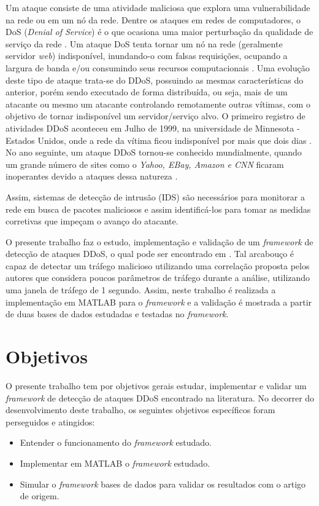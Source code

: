 Um ataque consiste de uma atividade maliciosa que explora uma vulnerabilidade na rede ou em um nó da rede. Dentre os ataques em redes de computadores, o DoS (\textit{Denial of Service}) é o que ocasiona uma maior perturbação da qualidade de serviço da rede \cite{badishi2006exposing}. Um ataque DoS tenta tornar um nó na rede (geralmente servidor \textit{web}) indisponível, inundando-o com falsas requisições, ocupando a largura de banda e/ou consumindo seus recursos computacionais \cite{1638123}. Uma evolução deste tipo de ataque trata-se do DDoS, possuindo as mesmas características do anterior, porém sendo executado de forma distribuída, ou seja, mais de um atacante ou mesmo um atacante controlando remotamente outras vítimas, com o objetivo de tornar indisponível um servidor/serviço alvo. O primeiro registro de atividades DDoS aconteceu em Julho de 1999, na universidade de Minnesota - Estados Unidos, onde a rede da vítima ficou indisponível por mais que dois dias \cite{srivastava2011recent}. No ano seguinte, um ataque DDoS tornou-se conhecido mundialmente, quando um grande número de sites como o \textit{Yahoo, EBay, Amazon e CNN} ficaram inoperantes devido a ataques dessa natureza \cite{calce2008mafiaboy}.

Assim, sistemas de detecção de intrusão (IDS) são necessários para monitorar a rede em busca de pacotes maliciosos e assim identificá-los para tomar as medidas corretivas que impeçam o avanço do atacante.

O presente trabalho faz o estudo, implementação e validação de um \textit{framework} de detecção de ataques DDoS, o qual pode ser encontrado em \cite{HOQUE201748}. Tal arcabouço é capaz de detectar um tráfego malicioso utilizando uma correlação proposta pelos autores que considera poucos parâmetros de tráfego durante a análise, utilizando uma janela de tráfego de 1 segundo. Assim, neste trabalho é realizada a implementação em MATLAB para o \textit{framework} e a validação é mostrada a partir de duas bases de dados estudadas e testadas no \textit{framework}.  

\section{Objetivos}
O presente trabalho tem por objetivos gerais estudar, implementar e validar um \textit{framework} de detecção de ataques DDoS encontrado na literatura. No decorrer do desenvolvimento deste trabalho, os seguintes objetivos específicos foram perseguidos e atingidos:
\begin{itemize}
	\item Entender o funcionamento do \textit{framework} estudado.
	\item Implementar em MATLAB o \textit{framework} estudado.
	\item Simular o \textit{framework} bases de dados para validar os resultados com o artigo de origem.
\end{itemize}
